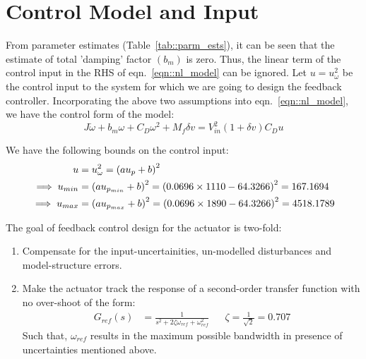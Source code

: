 \section{Control Model and Input}
From parameter estimates (Table~\ref{tab::parm_ests}), it can be seen that the
estimate of total 'damping' factor $( b_m )$ is zero. Thus, the linear term of
the control input in the RHS of eqn.~\ref{eqn::nl_model} can be ignored.
Let $u = u_\omega ^2 $ be the control input to the system for which we are going
to design the feedback controller. Incorporating the above two assumptions into
eqn.~\ref{eqn::nl_model}, we have the control form of the model:
\begin{equation} \label{eqn::control_form}
    J \dot \omega + b_m \omega + C_D \omega^2 + M_f \delta v = V_{in}^2 (1 + \delta v) C_D u
\end{equation}

We have the following bounds on the control input:
\begin{align*}
    u &= u_\omega^2 = \left( a u_p + b \right)^2\\
    \implies u_{min} &= \left( a u_{p_{min}}  + b \right)^2 = \left( 0.0696 \times 1110 - 64.3266 \right)^2 = 167.1694\\
    \implies u_{max} &= \left( a u_{p_{max}}  + b \right)^2 = \left( 0.0696 \times 1890 - 64.3266 \right)^2 = 4518.1789\\
\end{align*}

The goal of feedback control design for the actuator is two-fold:
\begin{enumerate}
\item Compensate for the input-uncertainities, un-modelled disturbances and
model-structure errors.
\item Make the actuator track the response of a second-order transfer function
with no over-shoot of the form:
\begin{align*}
    G_{ref}(s) &= \frac{1}{s^2 + 2 \zeta \omega_{ref} + \omega_{ref}^2}
    && \zeta = \frac{1}{\sqrt{2}} = 0.707
\end{align*}
Such that, $\omega_{ref}$ results in the maximum possible bandwidth in presence
of uncertainties mentioned above.
\end{enumerate}

